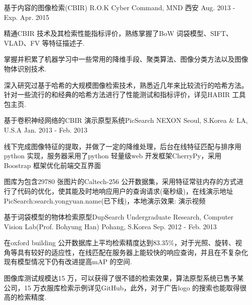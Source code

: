 

\begin{cventries}

  \cventry
    {基于内容的图像检索(CBIR)} %
    {R.O.K Cyber Command, MND} %
    {西安} %
    {Aug. 2013 - Exp. Apr. 2015} %
    {
      \begin{cvitems} %
        \item {精通CBIR 技术及其检索性能指标评价，熟练掌握了BoW 词袋模型、SIFT、VLAD、FV 等特征描述子.}
        \item {掌握并积累了机器学习中一些常用的降维手段、聚类算法、图像分类方法以及图像物体识别技术.}
        \item {深入研究过基于哈希的大规模图像检索技术，熟悉近几年来比较流行的哈希方法。针对一些流行的和经典的哈希方法进行了性能测试和指标评价，详见HABIR 工具包主页.}
      \end{cvitems}
    }

  \cventry
    {基于卷积神经网络的CBIR 演示原型系统PicSearch} %
    {NEXON} %
    {Seoul, S.Korea \& LA, U.S.A} %
    {Jan. 2013 - Feb. 2013} %
    {
      \begin{cvitems} %
        \item {线下完成图像特征的提取，并做了一定的降维处理，后台在线特征匹配与排序用python 实现，服务器采用了python 轻量级web 开发框架CherryPy，采用Boostrap 框架优化前端交互界面}
        \item {图库为包含29780 张图片的Caltech-256 公开数据集，采用特征常驻内存的方式进行了代码的优化，使其能及时地响应用户的查询请求(毫秒级)，在线演示地址PicSearch:search.yongyuan.name(已下线)，本地演示效果: 演示视频}
      \end{cvitems}
    }

  \cventry
    {基于词袋模型的物体检索原型DupSearch} %
    {Undergraduate Research, Computer Vision Lab(Prof. Bohyung Han)} %
    {Pohang, S.Korea} %
    {Sep. 2012 - Feb. 2013} %
    {
      \begin{cvitems} %
        \item {在oxford building 公开数据库上平均检索精度达到83.35\%，对于光照、旋转、视角等具有较好的适应性，在线匹配在服务器上能较快的响应查询，并且在不复杂化现有模型情况下仍有改进提高mAP 的空间.}
        \item {图像库测试规模达15 万，可以获得了很不错的检索效果，算法原型系统已售予某公司，15 万衣服库检索示例详见GitHub，此外，对于广告logo 的搜索也能取得很高的检索精度.}
      \end{cvitems}
    }


\end{cventries}
